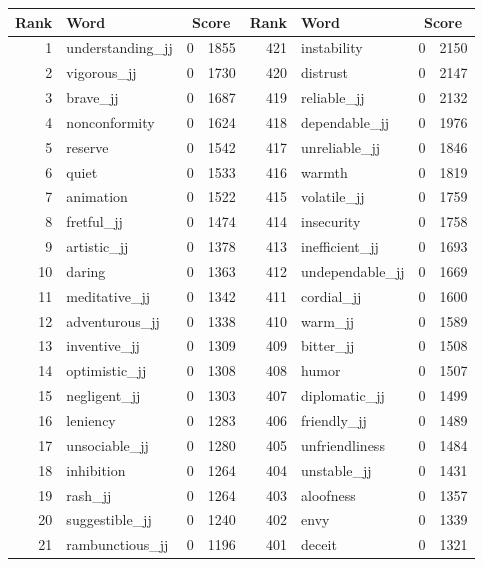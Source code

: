 \begin{table}[tbp]
    \begin{tabular}{| rlr@{.}l | rlr@{.}l |}
    \hline
    \textbf{Rank} & \textbf{Word} & \multicolumn{2}{c|}{\textbf{Score}} & \textbf{Rank} & \textbf{Word} & \multicolumn{2}{c|}{\textbf{Score}} \\
    \hline
    1 & understanding\_jj & 0 & 1855    &    421 & instability & 0 & 2150 \\
    2 & vigorous\_jj & 0 & 1730    &    420 & distrust & 0 & 2147 \\
    3 & brave\_jj & 0 & 1687    &    419 & reliable\_jj & 0 & 2132 \\
    4 & nonconformity & 0 & 1624    &    418 & dependable\_jj & 0 & 1976 \\
    5 & reserve & 0 & 1542    &    417 & unreliable\_jj & 0 & 1846 \\
    6 & quiet & 0 & 1533    &    416 & warmth & 0 & 1819 \\
    7 & animation & 0 & 1522    &    415 & volatile\_jj & 0 & 1759 \\
    8 & fretful\_jj & 0 & 1474    &    414 & insecurity & 0 & 1758 \\
    9 & artistic\_jj & 0 & 1378    &    413 & inefficient\_jj & 0 & 1693 \\
    10 & daring & 0 & 1363    &    412 & undependable\_jj & 0 & 1669 \\
    11 & meditative\_jj & 0 & 1342    &    411 & cordial\_jj & 0 & 1600 \\
    12 & adventurous\_jj & 0 & 1338    &    410 & warm\_jj & 0 & 1589 \\
    13 & inventive\_jj & 0 & 1309    &    409 & bitter\_jj & 0 & 1508 \\
    14 & optimistic\_jj & 0 & 1308    &    408 & humor & 0 & 1507 \\
    15 & negligent\_jj & 0 & 1303    &    407 & diplomatic\_jj & 0 & 1499 \\
    16 & leniency & 0 & 1283    &    406 & friendly\_jj & 0 & 1489 \\
    17 & unsociable\_jj & 0 & 1280    &    405 & unfriendliness & 0 & 1484 \\
    18 & inhibition & 0 & 1264    &    404 & unstable\_jj & 0 & 1431 \\
    19 & rash\_jj & 0 & 1264    &    403 & aloofness & 0 & 1357 \\
    20 & suggestible\_jj & 0 & 1240    &    402 & envy & 0 & 1339 \\
    21 & rambunctious\_jj & 0 & 1196    &    401 & deceit & 0 & 1321 \\

\end{tabular}
\end{table}
